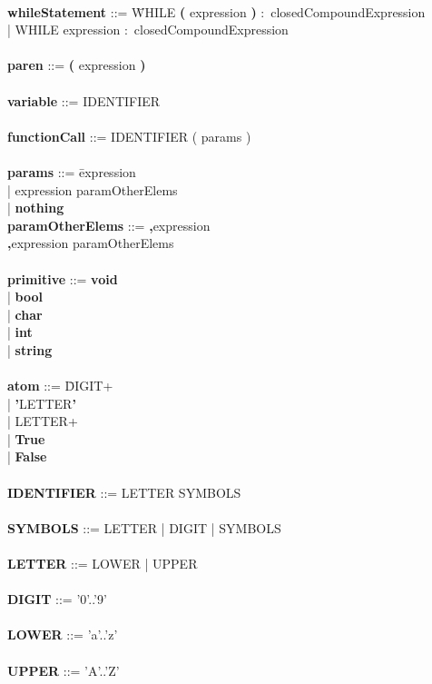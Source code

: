 \begin{tabbing}
\\
{\bf whileStatement}              ::= \=WHILE \textbf{(} expression \textbf{)} $\colon$ closedCompoundExpression\\
                                      \>| WHILE expression $\colon$ closedCompoundExpression\\
\\ 
{\bf paren}                       ::= \textbf{(} expression \textbf{)}\\
\\   
{\bf variable}                    ::= IDENTIFIER \\
\\   
{\bf functionCall}                ::= IDENTIFIER ( params ) \\
\\
{\bf params}                      ::= \=expression\\
                                      \>| expression paramOtherElems\\
                                      \>| \textbf{nothing}
\\
{\bf paramOtherElems}             ::= \=\textbf{,}expression\\
                                      \>\textbf{,}expression paramOtherElems\\
\\    
{\bf primitive}                   ::= \=\textbf{void}\\
                                      \>| \textbf{bool}\\
                                      \>| \textbf{char}\\
                                      \>| \textbf{int}\\
                                      \>| \textbf{string}\\
\\ 
{\bf atom}                        ::= \=DIGIT+\\
                                      \>| \textbf{'}LETTER\textbf{'}\\
                                      \>| LETTER+\\
                                      \>| \textbf{True}\\
                                      \>| \textbf{False}\\
\\
{\bf IDENTIFIER}                  ::= LETTER SYMBOLS\\
\\
{\bf SYMBOLS}                     ::= LETTER | DIGIT | SYMBOLS\\
\\
{\bf LETTER}                      ::= LOWER | UPPER\\
\\
{\bf DIGIT}                       ::= '0'..'9'\\
\\
{\bf LOWER}                       ::= 'a'..'z'\\
\\     
{\bf UPPER}                       ::= 'A'..'Z'\\
\\
\end{tabbing}
